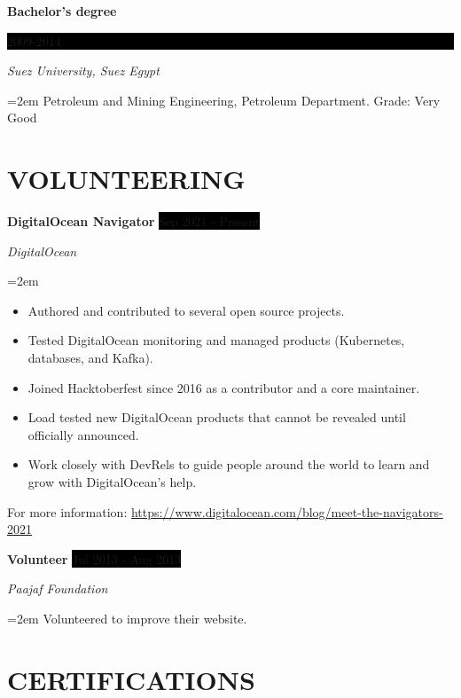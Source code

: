 \documentclass[paper=a4,fontsize=11pt]{scrartcl} %
\newcommand{\sepspace}{\vspace*{1em}}		%
\newcommand{\NewPart}[1]{\section*{\uppercase{#1}}}
\newcommand{\EducationEntry}[4]{
		\noindent \textbf{#1} \hfill      %
		\colorbox{Black}{%
			\parbox{6em}{%
			\hfill\color{White}#2}} \par  %
		\noindent \textit{#3} \par        %
		\noindent\hangindent=2em\hangafter=0 \small #4 %
		\normalsize \par}
\newcommand{\WorkEntry}[4]{				  %
		\noindent \textbf{#1} \hfill      %
		\colorbox{Black}{\color{White}#2} \par  %
		\noindent \textit{#3} \par              %
		\noindent\hangindent=2em\hangafter=0 \small #4 %
		\normalsize \par}
\begin{document}
\EducationEntry{Bachelor's degree}{2009-2014}{Suez University, Suez Egypt}{Petroleum and Mining Engineering, Petroleum Department. Grade: Very Good}


\NewPart{Volunteering}{}

\WorkEntry{DigitalOcean Navigator}{Sep 2021 - Present}{DigitalOcean}{\begin{itemize}
\item Authored and contributed to several open source projects.
\item Tested DigitalOcean monitoring and managed products (Kubernetes, databases, and Kafka).
\item Joined Hacktoberfest since 2016 as a contributor and a core maintainer.
\item Load tested new DigitalOcean products that cannot be revealed until officially announced.
\item Work closely with DevRels to guide people around the world to learn and grow with DigitalOcean's help.
\end{itemize}
For more information: \url{https://www.digitalocean.com/blog/meet-the-navigators-2021}}
\sepspace

\WorkEntry{Volunteer}{Jul 2013 - Aug 2013}{Paajaf Foundation}{Volunteered to improve their website.}


\NewPart{Certifications}{}
\end{document}
